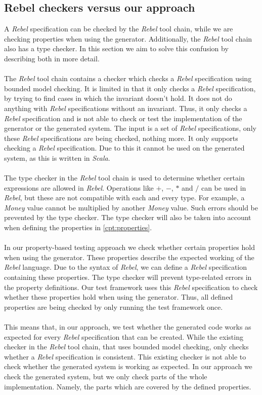 \subsection{Rebel checkers versus our approach}
A \textit{Rebel} specification can be checked by the \textit{Rebel} tool chain,
while we are checking properties when using the generator. Additionally, the
\textit{Rebel} tool chain also has a type checker. In this section we aim to
solve this confusion by describing both in more detail.\\
\\
The \textit{Rebel} tool chain contains a checker which checks a \textit{Rebel} specification using bounded model checking. It is limited in that it only checks a \textit{Rebel} specification, by trying to find cases in which the invariant doesn't hold. It does not do anything with \textit{Rebel} specifications without an invariant. Thus, it only checks a \textit{Rebel} specification and is not able to check or test the implementation of the generator or the generated system. The input is a set of \textit{Rebel} specifications, only these \textit{Rebel} specifications are being checked, nothing more. It only supports checking a \textit{Rebel} specification. Due to this it cannot be used on the generated system, as this is written in \textit{Scala}.\\
\\
The type checker in the \textit{Rebel} tool chain is used to determine whether certain expressions are allowed in \textit{Rebel}. Operations like \textit{$+$}, \textit{$-$}, \textit{$*$} and \textit{$/$} can be used in \textit{Rebel}, but these are not compatible with each and every type. For example, a \textit{Money} value cannot be multiplied by another \textit{Money} value. Such errors should be prevented by the type checker. The type checker will also be taken into account when defining the properties in \autoref{cpt:properties}.\\
\\
In our property-based testing approach we check whether certain properties hold when using the generator. These properties describe the expected working of the \textit{Rebel} language. Due to the syntax of \textit{Rebel}, we can define a \textit{Rebel} specification containing these properties. The type checker will prevent type-related errors in the property definitions. Our test framework uses this \textit{Rebel} specification to check whether these properties hold when using the generator. Thus, all defined properties are being checked by only running the test framework once.\\
\\
This means that, in our approach, we test whether the generated code works as expected for every \textit{Rebel} specification that can be created. While the existing checker in the \textit{Rebel} tool chain, that uses bounded model checking, only checks whether a \textit{Rebel} specification is consistent. This existing checker is not able to check whether the generated system is working as expected. In our approach we check the generated system, but we only check parts of the whole implementation. Namely, the parts which are covered by the defined properties.

